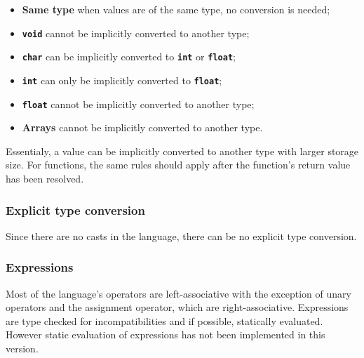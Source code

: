 \begin{itemize}
 \item \textbf{Same type} when values are of the same type, no conversion is needed;
 \item \textbf{\texttt{void}} cannot be implicitly converted to another type;
 \item \textbf{\texttt{char}} can be implicitly converted to \textbf{\texttt{int}} or \textbf{\texttt{float}};
 \item \textbf{\texttt{int}} can only be implicitly converted to \textbf{\texttt{float}};
 \item \textbf{\texttt{float}} cannot be implicitly converted to another type;
 \item \textbf{Arrays} cannot be implicitly converted to another type.
\end{itemize}

Essentialy, a value can be implicitly converted to another type with larger storage size.
For functions, the same rules should apply after the function's return value has been resolved.

\subsubsection{Explicit type conversion}

Since there are no casts in the language, there can be no explicit type conversion.

\subsubsection{Expressions}

Most of the language's operators are left-associative with the exception of unary operators
and the assignment operator, which are right-associative. Expressions are type checked
for incompatibilities and if possible, statically evaluated. However static evaluation of
expressions has not been implemented in this version.

